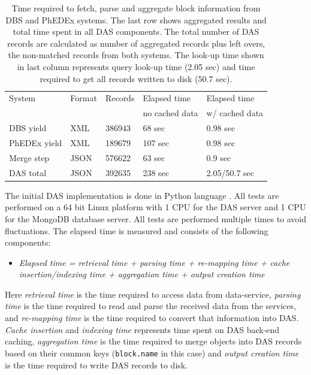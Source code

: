 \documentclass[1p,times]{elsarticle}
\begin{document}
\begin{table}[hbt]
\centering
\begin{tabular}{lllll}\hline
\hline
System & Format & Records & Elapsed time & Elapsed time \\
& & & no cached data & w/ cached data \\
\hline
DBS yield & XML & 386943 & 68 sec & 0.98 sec \\
PhEDEx yield & XML & 189679 & 107 sec & 0.98 sec \\
Merge step & JSON & 576622 & 63 sec & 0.9 sec \\
DAS total & JSON & 392635 & 238 sec & 2.05/50.7 sec \\
\hline
\hline
\end{tabular}
\caption{Time required to fetch, parse and aggregate block information
from DBS and PhEDEx systems. The last row shows aggregated results and 
total time spent in all DAS components.
The total number of DAS records are calculated as number of 
aggregated records plus left overs, the non-matched records from both systems. 
The look-up time shown in last column represents query look-up 
time (2.05 sec) and time required to get all records written 
to disk (50.7 sec).}
\label{DAS_benchmark}
\end{table}

The initial DAS implementation is done in Python language \cite{Python}.
All tests are performed on a 64 bit Linux platform with
1 CPU for the DAS server and 1 CPU for the MongoDB database server. 
All tests are performed multiple times to avoid fluctuations. 
The elapsed time is measured and consists of the following components:
\begin{itemize}
\item[]
{\it
Elapsed time = retrieval time + parsing time + re-mapping time 
        + cache insertion/indexing time 
        + aggregation time + output creation time
}
\end{itemize}
Here {\it retrieval time} is the time required to access data from data-service,
{\it parsing time} is the time required to read and parse the received data
from the services, and {\it re-mapping time} is the time required to convert 
that information into DAS. {\it Cache insertion} and {\it indexing time} 
represents time spent on DAS back-end caching, {\it aggregation time} is
the time required to merge objects into DAS records based
on their common keys (\verb+block.name+ in this case) and {\it output creation time}
is the time required to write DAS records to disk.
\end{document}

